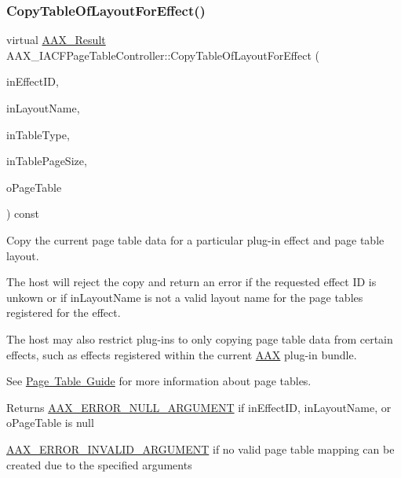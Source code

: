 \subsubsection{\texorpdfstring{CopyTableOfLayoutForEffect()}{CopyTableOfLayoutForEffect()}}
{\footnotesize\ttfamily virtual \mbox{\hyperlink{a00392_a4d8f69a697df7f70c3a8e9b8ee130d2f}{A\+A\+X\+\_\+\+Result}} A\+A\+X\+\_\+\+I\+A\+C\+F\+Page\+Table\+Controller\+::\+Copy\+Table\+Of\+Layout\+For\+Effect (\begin{DoxyParamCaption}\item[{const char $\ast$}]{in\+Effect\+ID,  }\item[{const char $\ast$}]{in\+Layout\+Name,  }\item[{uint32\+\_\+t}]{in\+Table\+Type,  }\item[{int32\+\_\+t}]{in\+Table\+Page\+Size,  }\item[{\mbox{\hyperlink{a01409}{I\+A\+C\+F\+Unknown}} $\ast$}]{o\+Page\+Table }\end{DoxyParamCaption}) const\hspace{0.3cm}{\ttfamily [pure virtual]}}

Copy the current page table data for a particular plug-\/in effect and page table layout.

The host will reject the copy and return an error if the requested effect ID is unkown or if {\ttfamily in\+Layout\+Name} is not a valid layout name for the page tables registered for the effect.

The host may also restrict plug-\/ins to only copying page table data from certain effects, such as effects registered within the current \mbox{\hyperlink{a00852}{A\+AX}} plug-\/in bundle.

See \mbox{\hyperlink{a00833}{Page Table Guide}} for more information about page tables.

\begin{DoxyReturn}{Returns}
\mbox{\hyperlink{a00494_a5f8c7439f3a706c4f8315a9609811937aa77cf0ad2d545c97b095d8bc19a7c969}{A\+A\+X\+\_\+\+E\+R\+R\+O\+R\+\_\+\+N\+U\+L\+L\+\_\+\+A\+R\+G\+U\+M\+E\+NT}} if {\ttfamily in\+Effect\+ID}, {\ttfamily in\+Layout\+Name}, or {\ttfamily o\+Page\+Table} is null

\mbox{\hyperlink{a00494_a5f8c7439f3a706c4f8315a9609811937a7d27a3bd88231e331c98d85f5b10e2eb}{A\+A\+X\+\_\+\+E\+R\+R\+O\+R\+\_\+\+I\+N\+V\+A\+L\+I\+D\+\_\+\+A\+R\+G\+U\+M\+E\+NT}} if no valid page table mapping can be created due to the specified arguments
\end{DoxyReturn}

